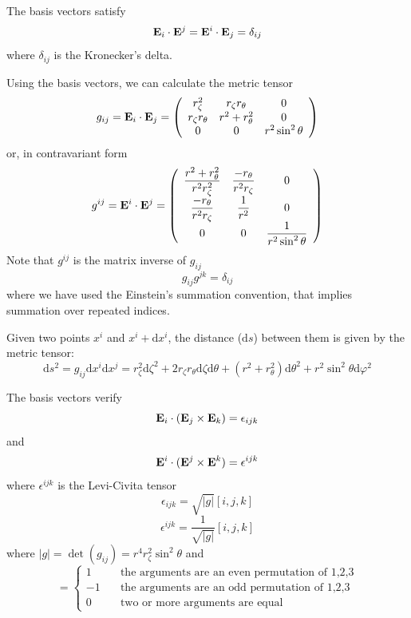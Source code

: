 The basis vectors satisfy
\begin{equation}
\mathbf{E}_i\cdot\mathbf{E}^j=\mathbf{E}^i\cdot\mathbf{E}_j=\delta_{ij}
\end{equation}
where $\delta_{ij}$ is the Kronecker's delta.

Using the basis vectors, we can calculate the metric tensor
\begin{equation}
g_{ij}=\mathbf{E}_i\cdot\mathbf{E}_j=\left(
\begin{array}{ccc}
r_\zeta^2&r_\zeta r_\theta&0\\
r_\zeta r_\theta&r^2+r_\theta^2&0\\
0&0&r^2\sin^2\theta
\end{array}
\right)
\end{equation}
or, in contravariant form
\begin{equation}
g^{ij}=\mathbf{E}^i\cdot\mathbf{E}^j=\left(
\begin{array}{ccc}
\displaystyle\frac{r^2+r_\theta^2}{r^2r_\zeta^2}&\displaystyle\frac{-r_\theta}{r^2r_\zeta}&0\\
\displaystyle\frac{-r_\theta}{r^2r_\zeta}&\displaystyle\frac{1}{r^2}&0\\
0&0&\displaystyle\frac{1}{r^2\sin^2\theta}
\end{array}
\right)
\end{equation}
Note that $g^{ij}$ is the matrix inverse of $g_{ij}$
$$g_{ij}g^{jk}=\delta_{ij}$$
where we have used the Einstein's summation convention, that implies summation over repeated indices.

Given two points $x^i$ and $x^i+\mathrm{d}x^i$, the distance ($\mathrm{d}s$) between them 
is given by the metric tensor:
\begin{equation}
\mathrm{d}s^2=g_{ij}\mathrm{d}x^i\mathrm{d}x^j=
r_\zeta^2\mathrm{d}\zeta^2+2r_\zeta r_\theta \mathrm{d}\zeta \mathrm{d}\theta+
(r^2+r_\theta^2)\mathrm{d}\theta^2+r^2\sin^2\theta \mathrm{d}\varphi^2
\end{equation}

The basis vectors verify
\begin{equation}
\mathbf{E}_i\cdot(\mathbf{E}_j\times\mathbf{E}_k)=\epsilon_{ijk}
\end{equation}
and
\begin{equation}
\mathbf{E}^i\cdot(\mathbf{E}^j\times\mathbf{E}^k)=\epsilon^{ijk}
\end{equation}
where $\epsilon^{ijk}$ is the Levi-Civita tensor
\begin{equation}
\epsilon_{ijk}=\sqrt{|g|}[i,j,k]
\end{equation}
\begin{equation}
\epsilon^{ijk}=\frac{1}{\sqrt{|g|}}[i,j,k]
\end{equation}
where $|g|=\det(g_{ij})=r^4r_\zeta^2\sin^2\theta$ and
\begin{equation}
[i,j,k]=\left\{
\begin{array}{ll}
1&\quad\mbox{the arguments are an even permutation of 1,2,3}\\
-1&\quad\mbox{the arguments are an odd permutation of 1,2,3}\\
0&\quad\mbox{two or more arguments are equal}
\end{array}
\right.
\end{equation}


